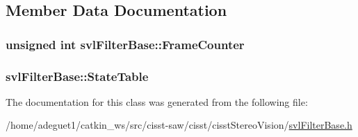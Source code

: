 \subsection{Member Data Documentation}
\hypertarget{classsvl_filter_base_ab12326fbaf20f3fe944aaa675a414c01}{
\subsubsection[{Frame\-Counter}]{\setlength{\rightskip}{0pt plus 5cm}unsigned int svl\-Filter\-Base\-::\-Frame\-Counter\hspace{0.3cm}{\ttfamily [protected]}}}\label{classsvl_filter_base_ab12326fbaf20f3fe944aaa675a414c01}
\hypertarget{classsvl_filter_base_a4abb6f966a72129f536745763e71820b}{
\subsubsection[{State\-Table}]{ svl\-Filter\-Base\-::\-State\-Table\hspace{0.3cm}{\ttfamily [protected]}}}\label{classsvl_filter_base_a4abb6f966a72129f536745763e71820b}


The documentation for this class was generated from the following file\-:\begin{DoxyCompactItemize}
\item 
/home/adeguet1/catkin\-\_\-ws/src/cisst-\/saw/cisst/cisst\-Stereo\-Vision/\hyperlink{svl_filter_base_8h}{svl\-Filter\-Base.\-h}\end{DoxyCompactItemize}
